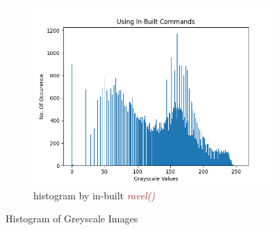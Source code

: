 \documentclass[a4paper]{article}
\begin{document}
\begin{itemize}
\begin{figure}[h!]
\begin{subfigure}[b]{0.4\linewidth}
        \end{subfigure}
        \begin{subfigure}[b]{0.4\linewidth}
            \centering
            \includegraphics[width=\linewidth]{Pictures/histogram/inbuilt commands.png}
            \caption{histogram by in-built \textcolor{brown}{\textit{ravel()}}}
        \end{subfigure}
        \caption{Histogram of Greyscale Images}
        \label{greyscaleHist}
    \end{figure}


\end{itemize}
\end{document}
